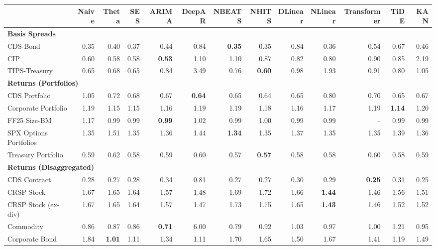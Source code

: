 \scriptsize
\setlength{\tabcolsep}{1.5pt}
\renewcommand{\arraystretch}{0.9}
\begin{tabular}{@{}lrrrrrrrrrrrr@{}}
\toprule
 & Naive & Theta & SES & ARIMA & DeepAR & NBEATS & NHITS & DLinear & NLinear & Transformer & TiDE & KAN \\
\midrule
\multicolumn{13}{l}{\textbf{Basis Spreads}} \\
CDS-Bond & 0.35 & 0.40 & 0.37 & 0.44 & 0.84 & \textbf{0.35} & 0.35 & 0.84 & 0.36 & 0.54 & 0.67 & 0.46 \\
CIP & 0.60 & 0.58 & 0.58 & \textbf{0.53} & 1.10 & 1.10 & 0.87 & 0.82 & 0.80 & 0.90 & 0.85 & 2.19 \\
TIPS-Treasury & 0.65 & 0.68 & 0.65 & 0.84 & 3.49 & 0.76 & \textbf{0.60} & 0.98 & 1.93 & 0.91 & 0.80 & 1.05 \\
\midrule
\multicolumn{13}{l}{\textbf{Returns (Portfolios)}} \\
CDS Portfolio & 1.05 & 0.72 & 0.68 & 0.67 & \textbf{0.64} & 0.65 & 0.64 & 0.65 & 0.80 & 0.70 & 0.65 & 0.67 \\
Corporate Portfolio & 1.19 & 1.15 & 1.15 & 1.16 & 1.19 & 1.19 & 1.18 & 1.16 & 1.17 & 1.19 & \textbf{1.14} & 1.20 \\
FF25 Size-BM & 1.17 & 0.99 & 0.99 & \textbf{0.99} & 1.02 & 0.99 & 1.00 & 0.99 & 0.99 & -- & 0.99 & 0.99 \\
SPX Options Portfolios & 1.35 & 1.51 & 1.35 & 1.36 & 1.44 & \textbf{1.34} & 1.35 & 1.37 & 1.35 & 1.35 & 1.39 & 1.36 \\
Treasury Portfolio & 0.59 & 0.62 & 0.58 & 0.59 & 0.60 & 0.57 & \textbf{0.57} & 0.58 & 0.58 & 0.60 & 0.58 & 0.59 \\
\midrule
\multicolumn{13}{l}{\textbf{Returns (Disaggregated)}} \\
CDS Contract & 0.28 & 0.27 & 0.28 & 0.34 & 0.81 & 0.27 & 0.27 & 0.30 & 0.29 & \textbf{0.25} & 0.31 & 0.25 \\
CRSP Stock & 1.67 & 1.65 & 1.64 & 1.57 & 1.48 & 1.69 & 1.72 & 1.66 & \textbf{1.44} & 1.46 & 1.56 & 1.51 \\
CRSP Stock (ex-div) & 1.67 & 1.65 & 1.64 & 1.57 & 1.47 & 1.73 & 1.75 & 1.65 & \textbf{1.43} & 1.46 & 1.52 & 1.52 \\
Commodity & 0.86 & 0.87 & 0.86 & \textbf{0.71} & 6.00 & 0.79 & 0.92 & 1.03 & 0.97 & 1.00 & 1.21 & 0.95 \\
Corporate Bond & 1.84 & \textbf{1.01} & 1.11 & 1.34 & 1.11 & 1.70 & 1.65 & 1.50 & 1.67 & 1.41 & 1.19 & 1.49 \\

\end{tabular}
